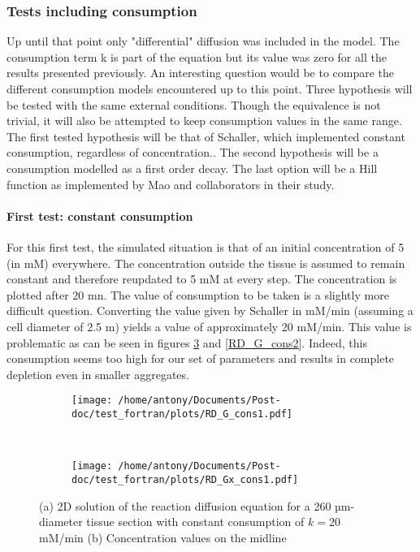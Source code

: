 \documentclass[11pt,a4paper]{article}
\begin{document}
\subsubsection{Tests including consumption}
Up until that point only "differential" diffusion was included in the model. The consumption term k is part of the equation but its value was zero for all the results presented previously. An interesting question would be to compare the different consumption models encountered up to this point. Three hypothesis will be tested with the same external conditions. Though the equivalence is not trivial, it will also be attempted to keep consumption values in the same range. The first tested hypothesis will be that of Schaller, which implemented constant consumption, regardless of concentration.\cite{Kempf2005}. The second hypothesis will be a consumption modelled as a first order decay. The last option will be a Hill function as implemented by Mao and collaborators in their study.\cite{Mao2018}

\paragraph{First test: constant consumption}
For this first test, the simulated situation is that of an initial concentration of 5 (in mM) everywhere. The concentration outside the tissue is assumed to remain constant and therefore reupdated to  5 mM at every step. The concentration is plotted after 20 mn. The value of consumption to be taken is a slightly more difficult question. Converting the value given by Schaller in mM/min (assuming a cell diameter of 2.5 \textmu m) yields a value of approximately 20 mM/min. This value is problematic as can be seen in figures \ref{RD_cons1} and \ref{RD_G_cons2}. Indeed, this consumption seems too high for our set of parameters and results in complete depletion even in smaller aggregates. 

\begin{figure}[ht!]
	\begin{subfigure}{0.45\textwidth}
	\centering
	\texttt{[image: /home/antony/Documents/Post-doc/test\_fortran/plots/RD\_G\_cons1.pdf]}
	\caption{ \label{RD_G_cons1}}
	\end{subfigure}
	~~
	\begin{subfigure}{0.45\textwidth}
	\texttt{[image: /home/antony/Documents/Post-doc/test\_fortran/plots/RD\_Gx\_cons1.pdf]}
		\caption{ \label{RD_Gx_cons1}}
	\end{subfigure}
	\caption{(a) 2D solution of the reaction diffusion equation for a 260 µm-diameter tissue section with constant consumption of $k = 20$ mM/min (b) Concentration values on the midline \label{RD_cons1}}
\end{figure} 
\end{document}
